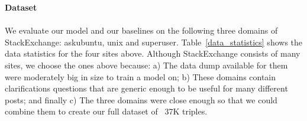 \documentclass[11pt]{article}
\begin{document}
\textbf{Dataset}\label{dataset}\\\\
We evaluate our model and our baselines on the following three domains of StackExchange: askubuntu, unix and superuser.
%
Table~\ref{data_statistics} shows the data statistics for the four sites above.  Although StackExchange consists of many sites, we choose the ones above because: a) The data dump available for them were moderately big in size to train a model on; b) These domains contain clarifications questions that are generic enough to be useful for many different posts; and finally c) The three domains were close enough so that we could combine them to create our full dataset of ~37K triples.


\end{document}
